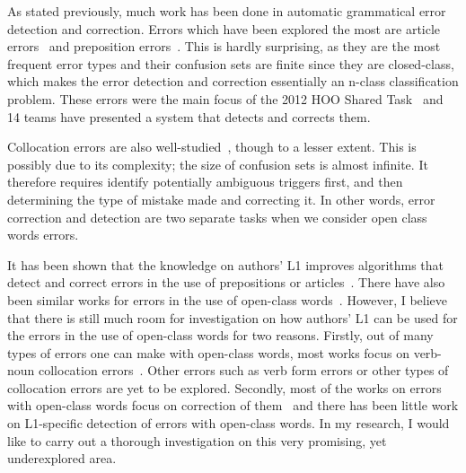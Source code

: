 \documentclass[11pt]{article}
\begin{document}
As stated previously, much work has been done in automatic grammatical error detection and correction. Errors which have been explored the most are article errors~\citep{han2006detecting, rozovskaya2010training, turner2007language, dahlmeier2011grammatical, de2008classifier} and preposition errors~\citep{bergsma2009web, tetreault2008ups, tetreault2010using, dahlmeier2011grammatical, de2008classifier, chodorow2007detection}. This is hardly surprising, as they are the most frequent error types and their confusion sets are finite since they are closed-class, which makes the error detection and correction essentially an n-class classification problem. These errors were the main focus of the 2012 HOO Shared Task~\citep{dale2012hoo} and 14 teams have presented a system that detects and corrects them.

Collocation errors are also well-studied~\citep{shei2000esl, wible2003bootstrapping, futagi2008computational, liu2009automated}, though to a lesser extent. This is possibly due to its complexity; the size of confusion sets is almost infinite. It therefore requires identify potentially ambiguous triggers first, and then determining the type of mistake made and correcting it. In other words, error correction and detection are two separate tasks when we consider open class words errors.

It has been shown that the knowledge on authors' L1 improves algorithms that detect and correct errors in the use of prepositions or articles~\citep{rozovskaya2010generating, rozovskaya2011algorithm}. There have also been similar works for errors in the use of open-class words~\citep{chang2008automatic, dahlmeier2011correcting, shei2000esl, liu2009automated}. However, I believe that there is still much room for investigation on how authors' L1 can be used for the errors in the use of open-class words for two reasons. Firstly, out of many types of errors one can make with open-class words, most works focus on verb-noun collocation errors~\citep{chang2008automatic, shei2000esl, liu2009automated}. Other errors such as verb form errors or other types of collocation errors are yet to be explored. Secondly, most of the works on errors with open-class words focus on correction of them~\citep{dahlmeier2011correcting, chang2008automatic} and there has been little work on L1-specific detection of errors with open-class words.  In my research, I would like to carry out a thorough investigation on this very promising, yet underexplored area.
\end{document}
